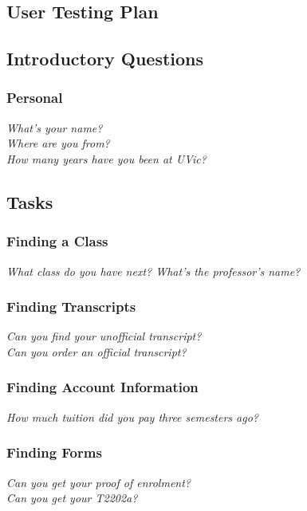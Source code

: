 \documentclass{article}
\begin{document}
\pagebreak
\begin{appendices}

\section{User Testing Plan}\label{ap:utesting}

\subsection*{Introductory Questions}\label{introductory-questions}
\subsubsection*{Personal}\label{personal}
\emph{What's your name?} \\
\emph{Where are you from?} \\
\emph{How many years have you been at UVic?} \\
\subsection*{Tasks}\label{tasks}
\subsubsection*{Finding a Class}\label{finding-a-class}
\emph{What class do you have next? What's the professor's name?} \\
\subsubsection*{Finding Transcripts}\label{finding-transcripts}
\emph{Can you find your unofficial transcript?} \\
\emph{Can you order an official transcript?} \\
\subsubsection*{Finding Account Information}\label{finding-account-information}
\emph{How much tuition did you pay three semesters ago?} \\
\subsubsection*{Finding Forms}\label{finding-forms}
\emph{Can you get your proof of enrolment?} \\
\emph{Can you get your T2202a?} \\

\end{appendices}
\end{document}
